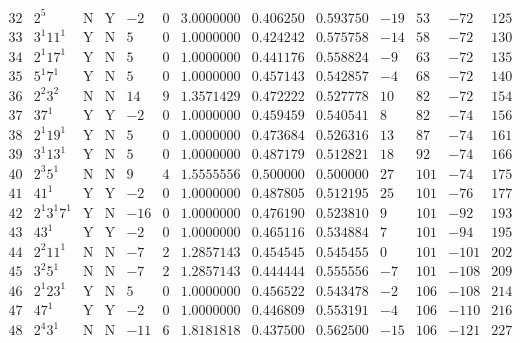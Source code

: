 \documentclass[11pt,reqno,a4letter]{article}
\numberwithin{equation}{section}
\numberwithin{figure}{section}
\numberwithin{table}{section}
\theoremstyle{plain}
\numberwithin{theorem}{section}
\theoremstyle{definition}
\begin{document}
\begin{table}[ht!]
\begin{equation*}
{\begin{array}{cc|cc|ccc|cc|cccc}
 32 & 2^5 & \text{N} & \text{Y} & -2 & 0 & 3.0000000 & 0.406250 & 0.593750 & -19 & 53 & -72 & 125 \\
 33 & 3^1 11^1 & \text{Y} & \text{N} & 5 & 0 & 1.0000000 & 0.424242 & 0.575758 & -14 & 58 & -72 & 130 \\
 34 & 2^1 17^1 & \text{Y} & \text{N} & 5 & 0 & 1.0000000 & 0.441176 & 0.558824 & -9 & 63 & -72 & 135 \\
 35 & 5^1 7^1 & \text{Y} & \text{N} & 5 & 0 & 1.0000000 & 0.457143 & 0.542857 & -4 & 68 & -72 & 140 \\
 36 & 2^2 3^2 & \text{N} & \text{N} & 14 & 9 & 1.3571429 & 0.472222 & 0.527778 & 10 & 82 & -72 & 154 \\
 37 & 37^1 & \text{Y} & \text{Y} & -2 & 0 & 1.0000000 & 0.459459 & 0.540541 & 8 & 82 & -74 & 156 \\
 38 & 2^1 19^1 & \text{Y} & \text{N} & 5 & 0 & 1.0000000 & 0.473684 & 0.526316 & 13 & 87 & -74 & 161 \\
 39 & 3^1 13^1 & \text{Y} & \text{N} & 5 & 0 & 1.0000000 & 0.487179 & 0.512821 & 18 & 92 & -74 & 166 \\
 40 & 2^3 5^1 & \text{N} & \text{N} & 9 & 4 & 1.5555556 & 0.500000 & 0.500000 & 27 & 101 & -74 & 175 \\
 41 & 41^1 & \text{Y} & \text{Y} & -2 & 0 & 1.0000000 & 0.487805 & 0.512195 & 25 & 101 & -76 & 177 \\
 42 & 2^1 3^1 7^1 & \text{Y} & \text{N} & -16 & 0 & 1.0000000 & 0.476190 & 0.523810 & 9 & 101 & -92 & 193 \\
 43 & 43^1 & \text{Y} & \text{Y} & -2 & 0 & 1.0000000 & 0.465116 & 0.534884 & 7 & 101 & -94 & 195 \\
 44 & 2^2 11^1 & \text{N} & \text{N} & -7 & 2 & 1.2857143 & 0.454545 & 0.545455 & 0 & 101 & -101 & 202 \\
 45 & 3^2 5^1 & \text{N} & \text{N} & -7 & 2 & 1.2857143 & 0.444444 & 0.555556 & -7 & 101 & -108 & 209 \\
 46 & 2^1 23^1 & \text{Y} & \text{N} & 5 & 0 & 1.0000000 & 0.456522 & 0.543478 & -2 & 106 & -108 & 214 \\
 47 & 47^1 & \text{Y} & \text{Y} & -2 & 0 & 1.0000000 & 0.446809 & 0.553191 & -4 & 106 & -110 & 216 \\
 48 & 2^4 3^1 & \text{N} & \text{N} & -11 & 6 & 1.8181818 & 0.437500 & 0.562500 & -15 & 106 & -121 & 227 \\
\end{array}
}
\end{equation*}


\end{table}
\end{document}
